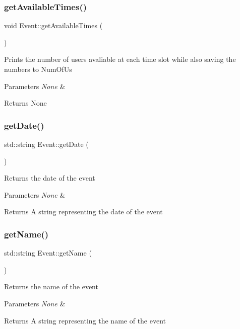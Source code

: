 \subsubsection{\texorpdfstring{get\+Available\+Times()}{getAvailableTimes()}}
{\footnotesize\ttfamily void Event\+::get\+Available\+Times (\begin{DoxyParamCaption}{ }\end{DoxyParamCaption})}

Prints the number of users avaliable at each time slot while also saving the numbers to Num\+Of\+Us 
\begin{DoxyParams}{Parameters}
{\em None} & \\
\hline
\end{DoxyParams}
\begin{DoxyReturn}{Returns}
None 
\end{DoxyReturn}
\mbox{\label{class_event_a1fb318a969eaf352d3f507b8097bd810}} 
\subsubsection{\texorpdfstring{get\+Date()}{getDate()}}
{\footnotesize\ttfamily std\+::string Event\+::get\+Date (\begin{DoxyParamCaption}{ }\end{DoxyParamCaption})}

Returns the date of the event 
\begin{DoxyParams}{Parameters}
{\em None} & \\
\hline
\end{DoxyParams}
\begin{DoxyReturn}{Returns}
A string representing the date of the event 
\end{DoxyReturn}
\mbox{\label{class_event_adf0f3e50061123d6f24200661eeb66eb}} 
\subsubsection{\texorpdfstring{get\+Name()}{getName()}}
{\footnotesize\ttfamily std\+::string Event\+::get\+Name (\begin{DoxyParamCaption}{ }\end{DoxyParamCaption})}

Returns the name of the event 
\begin{DoxyParams}{Parameters}
{\em None} & \\
\hline
\end{DoxyParams}
\begin{DoxyReturn}{Returns}
A string representing the name of the event 
\end{DoxyReturn}
\mbox{\label{class_event_a00e5f70b33801f1081ccc434a276aca5}} 
